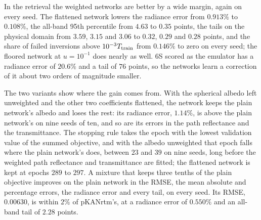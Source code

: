 \documentclass[11pt]{article}
\theoremstyle{remark}
\newcommand{\1}{\mathbf{1}}
\begin{document}
\begin{table}[t]
\centering\footnotesize\setlength{\tabcolsep}{3pt}
\resizebox{\textwidth}{!}{}
\caption{The published libRadtran benchmark of \cite{pkan}: test scores on the release's split. Upper block, the
release's metrics over the three coefficients of every test row, and the RMSE of each coefficient; the first seven rows
are the values published in Table~3 of the release for its model and its six baselines. Lower block, the
retrieval scores at $\rho=0.7$: the mean relative error of the top-of-atmosphere reflectance over the bands of a state,
the 95th percentiles of $|\hat\rho-\rho|$ in points over all rows and on the physical domain above $fT_{\rm train}$, and
the share of failed inversions above $10^{-3}T_{\rm train}$. Mean $\pm$ standard deviation over ten seeds; 6S as the
emulator is the release's low-fidelity code scored as it stands.}\label{tab:pkan}
\end{table}

In the retrieval the weighted networks are better by a wide margin, again on every seed. The flattened network lowers
the radiance error from $0.913\%$ to $0.108\%$, the all-band 95th percentile from $4.63$ to $0.35$ points, the tails on
the physical domain from $3.59$, $3.15$ and $3.06$ to $0.32$, $0.29$ and $0.28$ points, and the share of failed
inversions above $10^{-3}T_{\rm train}$ from $0.146\%$ to zero on every seed; the floored network at $u=10^{-1}$ does
nearly as well. 6S scored as the emulator has a radiance error of $20.6\%$ and a tail of $76$ points, so the networks
learn a correction of it about two orders of magnitude smaller.

The two variants show where the gain comes from. With the spherical albedo left unweighted and the other two
coefficients flattened, the network keeps the plain network's albedo and loses the rest: its radiance error,
$1.14\%$, is above the plain network's on nine seeds of ten, and so are its errors in the path reflectance and the
transmittance. The stopping rule takes the epoch with the lowest validation value of the summed objective, and with the
albedo unweighted that epoch falls where the plain network's does, between $23$ and $39$ on nine seeds, long before the
weighted path reflectance and transmittance are fitted; the flattened network is kept at epochs $289$ to $297$. A
mixture that keeps three tenths of the plain objective improves on the plain network in the RMSE, the mean absolute and
percentage errors, the radiance error and every tail, on every seed. Its RMSE, $0.00630$, is within $2\%$ of pKANrtm's,
at a radiance error of $0.550\%$ and an all-band tail of $2.28$ points.
\end{document}
